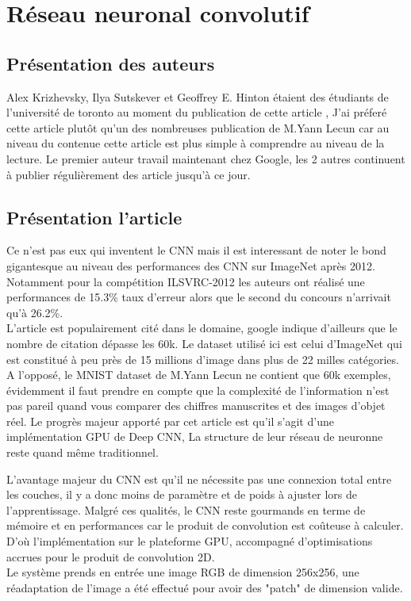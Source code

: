 \documentclass[12pt, letterpaper]{article}
\begin{document}
\section{Réseau neuronal convolutif}
\subsection{Présentation des auteurs}
Alex Krizhevsky, Ilya Sutskever et Geoffrey E. Hinton étaient des étudiants de l'université de toronto au moment du publication 
de cette article \autocite{NIPS2012_4824}, J'ai préferé cette article plutôt qu'un des nombreuses publication de M.Yann Lecun car au niveau 
du contenue cette article est plus simple à comprendre au niveau de la lecture.
Le premier auteur travail maintenant chez Google, les 2 autres continuent à publier régulièrement des article jusqu'à ce jour.

\subsection{Présentation l'article}
\par Ce n'est pas eux qui inventent le CNN mais il est interessant de noter le bond gigantesque au niveau des performances des CNN sur ImageNet après 2012.
Notamment pour la compétition ILSVRC-2012 les auteurs ont réalisé une performances de 15.3\% taux d'erreur alors que le second 
du concours n'arrivait qu'à 26.2\%.\\
L'article est populairement cité dans le domaine, google indique d'ailleurs que le nombre de citation dépasse les 60k.
Le dataset utilisé ici est celui d'ImageNet qui est constitué à peu près de 15 millions d'image dans plus de 22 milles catégories.
A l'opposé, le MNIST dataset de M.Yann Lecun ne contient que 60k exemples, évidemment il faut prendre en compte que la complexité 
de l'information n'est pas pareil quand vous comparer des chiffres manuscrites et des images d'objet réel.
Le progrès majeur apporté par cet article est qu'il s'agit d'une implémentation GPU de Deep CNN, La structure de leur réseau de neuronne 
reste quand même traditionnel.
\par L'avantage majeur du CNN est qu'il ne nécessite pas une connexion total entre les couches, il y a donc moins de paramètre et de poids à ajuster lors
de l'apprentissage. Malgré ces qualités, le CNN reste gourmands en terme de mémoire et en performances car le produit de convolution est coûteuse à calculer.
D'où l'implémentation sur le plateforme GPU, accompagné d'optimisations accrues pour le produit de convolution 2D. \\
Le système prends en entrée une image RGB de dimension 256x256, une réadaptation de l'image a été effectué pour avoir des "patch" de dimension valide.
\end{document}
